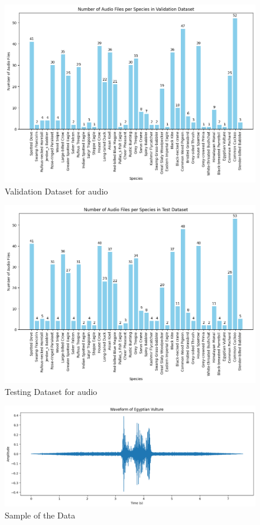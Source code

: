 \begin{figure}[h!]
    \centering
    \includegraphics[scale=0.4]{images/ValidationDataset.png}
    \caption{Validation Dataset for audio}
\end{figure}
\newpage
\begin{figure}[h!]
    \centering
    \includegraphics[scale=0.45]{images/TestDataset.png}
    \caption{Testing Dataset for audio}
\end{figure}
\hspace{3.5cm}
\begin{figure}[h!]
    \centering
    \includegraphics[scale=0.38]{images/SampleData.png}
    \caption{Sample of the Data}
    \label{fig:SampleData}
\end{figure}
\newpage
